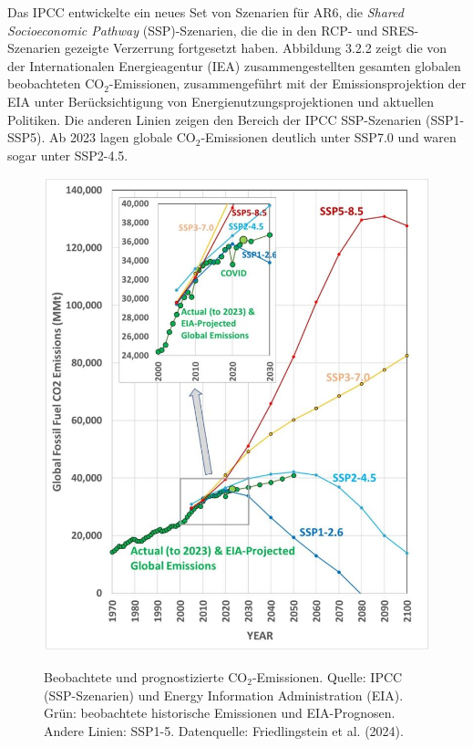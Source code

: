 \documentclass[12pt,paper=a4,DIV=12,parskip=never,chapterprefix=false,headings=standardclasses]{scrreprt}
\begin{document}
Das IPCC entwickelte ein neues Set von Szenarien für AR6, die \emph{Shared Socioeconomic Pathway} (SSP)-Szenarien, die die in den RCP- und SRES-Szenarien gezeigte Verzerrung fortgesetzt haben. Abbildung 3.2.2 zeigt die von der Internationalen Energieagentur (IEA) zusammengestellten gesamten globalen beobachteten CO$_2$-Emissionen, zusammengeführt mit der Emissionsprojektion der EIA unter Berücksichtigung von Energienutzungsprojektionen und aktuellen Politiken. Die anderen Linien zeigen den Bereich der IPCC SSP-Szenarien (SSP1-SSP5). Ab 2023 lagen globale CO$_2$-Emissionen deutlich unter SSP7.0 und waren sogar unter SSP2-4.5.

\begin{figure}[H]
\begin{center}
\includegraphics[width=1.0\textwidth]{bilder/bilderKlima-0012.jpg}\\[1cm]
\end{center}
\caption{Beobachtete und prognostizierte CO$_2$-Emissionen. Quelle: IPCC (SSP-Szenarien) und
Energy Information Administration (EIA). Grün: beobachtete historische Emissionen und EIA-Prognosen.
Andere Linien: SSP1-5. Datenquelle: Friedlingstein et al. (2024).}
\end{figure}
\end{document}
